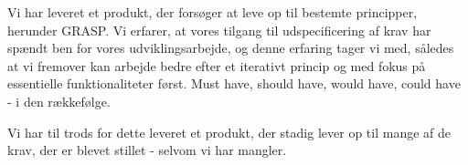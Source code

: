 Vi har leveret et produkt, der forsøger at leve op til bestemte principper, herunder GRASP. Vi erfarer, at vores tilgang til udspecificering af krav har spændt ben for vores udviklingsarbejde, og denne erfaring tager vi med, således at vi fremover kan arbejde bedre efter et iterativt princip og med fokus på essentielle funktionaliteter først. Must have, should have, would have, could have - i den rækkefølge.

Vi har til trods for dette leveret et produkt, der stadig lever op til mange af de krav, der er blevet stillet - selvom vi har mangler.